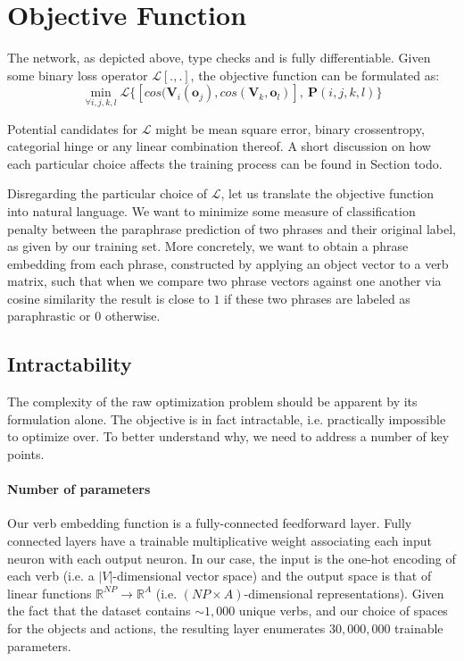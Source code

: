 \documentclass[a4paper,11pt]{article}
\newcommand{\abs}[1]{\lvert #1\rvert}
\begin{document}
\section{Objective Function}
\label{sec:obj}
The network, as depicted above, type checks and is fully differentiable. Given some binary loss operator $\mathcal{L}[.,.]$, the objective function can be formulated as:
\[
\min_{\forall i,j,k,l} \mathcal{L}\{[cos(\mathbf{V}_i(\mathbf{o}_j), cos(\mathbf{V}_k,\mathbf{o}_l)], \ \mathbf{P}(i,j,k,l)\}
\]

Potential candidates for $\mathcal{L}$ might be mean square error, binary crossentropy, categorial hinge or any linear combination thereof. A short discussion on how each particular choice affects the training process can be found in Section todo.

Disregarding the particular choice of $\mathcal{L}$, let us translate the objective function into natural language. We want to minimize some measure of classification penalty between the paraphrase prediction of two phrases and their original label, as given by our training set. More concretely, we want to obtain a phrase embedding from each phrase, constructed by applying an object vector to a verb matrix, such that when we compare two phrase vectors against one another via cosine similarity the result is close to $1$ if these two phrases are labeled as paraphrastic or $0$ otherwise.

\subsection{Intractability}
The complexity of the raw optimization problem should be apparent by its formulation alone. The objective is in fact intractable, i.e. practically impossible to optimize over. To better understand why, we need to address a number of key points.

\paragraph{Number of parameters}
Our verb embedding function is a fully-connected feedforward layer. Fully connected layers have a trainable multiplicative weight associating each input neuron with each output neuron. In our case, the input is the one-hot encoding of each verb (i.e. a $\abs{V}$-dimensional vector space) and the output space is that of linear functions $\mathbb{R}^{NP} \to \mathbb{R}^{A}$ (i.e. $(NP \times A)$-dimensional representations). Given the fact that the dataset contains $\sim 1,000$ unique verbs, and our choice of spaces for the objects 
and actions, the resulting layer enumerates $30,000,000$ trainable parameters.
\end{document}

